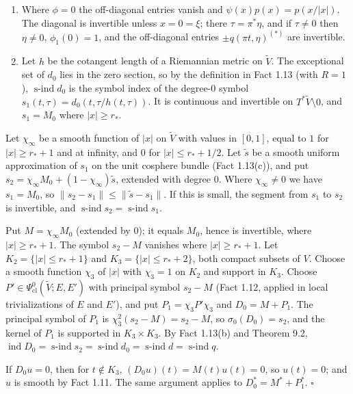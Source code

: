\documentclass[
  11pt,
]{article}
\begin{document}
\begin{enumerate}
\def\labelenumi{(\arabic{enumi})}
\setcounter{enumi}{1}
\item
  Where \(\phi=0\) the off-diagonal entries vanish and
  \(\psi(x)p(x)=p(x/|x|)\). The diagonal is invertible unless
  \(x=0=\xi\); there \(\tau=\pi^*\eta\), and if \(\tau\ne0\) then
  \(\eta\ne0\), \(\phi_1(0)=1\), and the off-diagonal entries
  \(\pm q(\pi t,\eta)^{(*)}\) are invertible.
\item
  Let \(h\) be the cotangent length of a Riemannian metric on
  \(\tilde V\). The exceptional set of \(d_0\) lies in the zero section,
  so by the definition in Fact 1.13 (with \(R=1\)),
  \(\operatorname{s-ind}d_0\) is the symbol index of the degree-\(0\)
  symbol \(s_1(t,\tau)=d_0(t,\tau/h(t,\tau))\). It is continuous and
  invertible on \(T^*\tilde V\setminus0\), and \(s_1=M_0\) where
  \(|x|\ge r_*\).
\end{enumerate}

Let \(\chi_\infty\) be a smooth function of \(|x|\) on \(\tilde V\) with
values in \([0,1]\), equal to \(1\) for \(|x|\ge r_*+1\) and at
infinity, and \(0\) for \(|x|\le r_*+1/2\). Let \(\tilde s\) be a smooth
uniform approximation of \(s_1\) on the unit cosphere bundle (Fact
1.13(c)), and put \(s_2=\chi_\infty M_0+(1-\chi_\infty)\tilde s\),
extended with degree \(0\). Where \(\chi_\infty\ne0\) we have
\(s_1=M_0\), so \(\|s_2-s_1\|\le\|\tilde s-s_1\|\). If this is small,
the segment from \(s_1\) to \(s_2\) is invertible, and
\(\operatorname{s-ind}s_2=\operatorname{s-ind}s_1\).

Put \(M=\chi_\infty M_0\) (extended by \(0\)); it equals \(M_0\), hence
is invertible, where \(|x|\ge r_*+1\). The symbol \(s_2-M\) vanishes
where \(|x|\ge r_*+1\). Let \(K_2=\{|x|\le r_*+1\}\) and
\(K_3=\{|x|\le r_*+2\}\), both compact subsets of \(V\). Choose a smooth
function \(\chi_3\) of \(|x|\) with \(\chi_3=1\) on \(K_2\) and support
in \(K_3\). Choose \(P'\in\Psi^0_{\mathrm{cl}}(\tilde V;E,E')\) with
principal symbol \(s_2-M\) (Fact 1.12, applied in local trivializations
of \(E\) and \(E'\)), and put \(P_1=\chi_3P'\chi_3\) and \(D_0=M+P_1\).
The principal symbol of \(P_1\) is \(\chi_3^2(s_2-M)=s_2-M\), so
\(\sigma_0(D_0)=s_2\), and the kernel of \(P_1\) is supported in
\(K_3\times K_3\). By Fact 1.13(b) and Theorem 9.2,
\(\operatorname{ind}D_0=\operatorname{s-ind}s_2=\operatorname{s-ind}d_0=\operatorname{s-ind}d=\operatorname{s-ind}q\).

If \(D_0u=0\), then for \(t\notin K_3\), \((D_0u)(t)=M(t)u(t)=0\), so
\(u(t)=0\); and \(u\) is smooth by Fact 1.11. The same argument applies
to \(D_0^*=M^*+P_1^*\). \(\square\)
\end{document}
